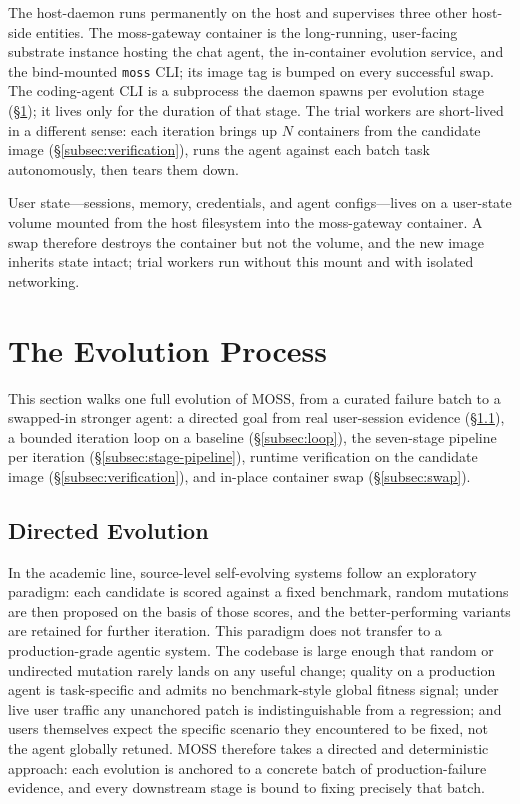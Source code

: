 \documentclass{article}
\begin{document}
The host-daemon runs permanently on the host and supervises three other host-side entities. The moss-gateway container is the long-running, user-facing substrate instance hosting the chat agent, the in-container evolution service, and the bind-mounted \texttt{moss} CLI; its image tag is bumped on every successful swap. The coding-agent CLI is a subprocess the daemon spawns per evolution stage (\S\ref{sec:evolution}); it lives only for the duration of that stage. The trial workers are short-lived in a different sense: each iteration brings up $N$ containers from the candidate image (\S\ref{subsec:verification}), runs the agent against each batch task autonomously, then tears them down.

User state---sessions, memory, credentials, and agent configs---lives on a user-state volume mounted from the host filesystem into the moss-gateway container. A swap therefore destroys the container but not the volume, and the new image inherits state intact; trial workers run without this mount and with isolated networking.


\section{The Evolution Process}
\label{sec:evolution}

This section walks one full evolution of MOSS, from a curated failure batch to a swapped-in stronger agent: a directed goal from real user-session evidence (\S\ref{subsec:directed}), a bounded iteration loop on a baseline (\S\ref{subsec:loop}), the seven-stage pipeline per iteration (\S\ref{subsec:stage-pipeline}), runtime verification on the candidate image (\S\ref{subsec:verification}), and in-place container swap (\S\ref{subsec:swap}).

\subsection{Directed Evolution}
\label{subsec:directed}

In the academic line, source-level self-evolving systems follow an exploratory paradigm: each candidate is scored against a fixed benchmark, random mutations are then proposed on the basis of those scores, and the better-performing variants are retained for further iteration. This paradigm does not transfer to a production-grade agentic system. The codebase is large enough that random or undirected mutation rarely lands on any useful change; quality on a production agent is task-specific and admits no benchmark-style global fitness signal; under live user traffic any unanchored patch is indistinguishable from a regression; and users themselves expect the specific scenario they encountered to be fixed, not the agent globally retuned. MOSS therefore takes a directed and deterministic approach: each evolution is anchored to a concrete batch of production-failure evidence, and every downstream stage is bound to fixing precisely that batch.
\end{document}
